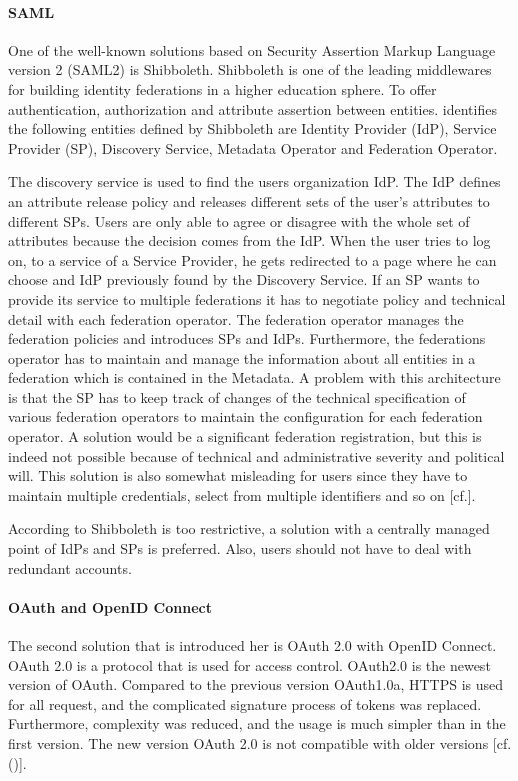 {{{	
		
	\paragraph{SAML}
	\label{SAML}
	One of the well-known solutions based on Security Assertion Markup Language version 2 (SAML2) is Shibboleth. Shibboleth is one of the leading middlewares for building identity federations in a higher education sphere. To offer authentication, authorization and attribute assertion between entities. \cite{Prochazka:2010:UCA} identifies the following entities defined by Shibboleth are Identity Provider (IdP), Service Provider (SP), Discovery Service, Metadata Operator and Federation Operator.
	
	The discovery service is used to find the users organization IdP. The IdP defines an attribute release policy and releases different sets of the user's attributes to different SPs. Users are only able to agree or disagree with the whole set of attributes because the decision comes from the IdP. When the user tries to log on, to a service of a Service Provider, he gets redirected to a page where he can choose and IdP previously found by the Discovery Service. If an SP wants to provide its service to multiple federations it has to negotiate policy and technical detail with each federation operator. The federation operator manages the federation policies and introduces SPs and IdPs. Furthermore, the federations operator has to maintain and manage the information about all entities in a federation which is contained in the Metadata. A problem with this architecture is that the SP has to keep track of changes of the technical specification of various federation operators to maintain the configuration for each federation operator. A solution would be a significant federation registration, but this is indeed not possible because of technical and administrative severity and political will. This solution is also somewhat misleading for users since they have to maintain multiple credentials, select from multiple identifiers and so on [cf.\cite{Prochazka:2010:UCA}].
	
	According to \cite{Prochazka:2010:UCA} Shibboleth is too restrictive, a solution with a centrally managed point of IdPs and SPs is preferred. Also, users should not have to deal with redundant accounts.		
	
	\paragraph{OAuth and OpenID Connect}
	\label{OAuthAndOpenID}
	The second solution that is introduced her is OAuth 2.0 with OpenID Connect.	OAuth 2.0 is a protocol that is used for access control. OAuth2.0 is the newest version of  OAuth. Compared to the previous version OAuth1.0a, HTTPS is used for all request, and the complicated signature process of tokens was replaced. Furthermore, complexity was reduced, and the usage is much simpler than in the first version. The new version OAuth 2.0 is not compatible with older versions [cf. (\cite{LeBlanc:2011:SocialApplications})].
	
}}}
